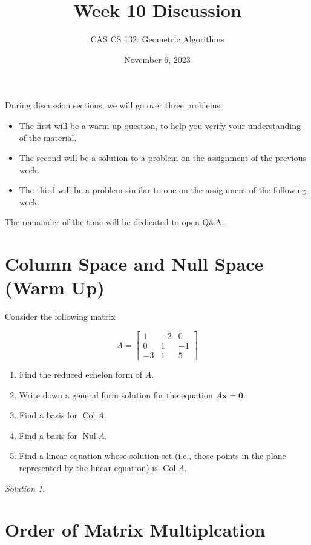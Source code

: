\documentclass{article}
\title{
  Week 10 Discussion
}
\author{CAS CS 132: Geometric Algorithms}
\date{November 6, 2023}
\newcommand{\vv}[1]{\mathbf{#1}}
\DeclareMathOperator{\col}{Col}
\DeclareMathOperator{\nul}{Nul}
\theoremstyle{remark}
\newtheorem*{solution}{Solution}
\begin{document}
\maketitle

\noindent During discussion sections, we will go over three problems.
\begin{itemize}
\item The first will be a warm-up question, to help you verify your understanding of the material.
\item The second will be a solution to a problem on the assignment of the previous week.
\item The third will be a problem similar to one on the assignment of the following week.
\end{itemize}
The remainder of the time will be dedicated to open Q\&A.

\pagebreak
\section{Column Space and Null Space (Warm Up)}

Consider the following matrix

\begin{displaymath}
  A =
  \begin{bmatrix}
    1 & -2 & 0 \\
    0 & 1 & -1 \\
    -3 & 1 & 5
  \end{bmatrix}
\end{displaymath}

\begin{enumerate}
\item Find the reduced echelon form of $A$.
\item Write down a general form solution for the equation $A\vv x = \vv 0$.
\item Find a basis for $\col A$.
\item Find a basis for $\nul A$.
\item Find a linear equation whose solution set (i.e., those points in the plane represented by the linear equation) is $\col A$.
\end{enumerate}

\medskip

\begin{solution}
\end{solution}

\pagebreak
\section{Order of Matrix Multiplcation}
\end{document}
